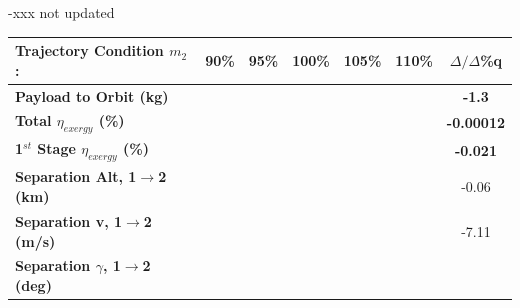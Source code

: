 -xxx not updated
\begin{table}[ht]
	\centering
	
	\begin{tabular}{l c c c c c c} %
	\hline \textbf{Trajectory Condition  \qquad  $m_{2}$: }
	&90\%
	&95\%
	&100\%
	& 105\%
	& 110\%
	& $\Delta/\Delta$\%q
		\\
		\hline \textbf{Payload to Orbit (kg)}
		& \textbf{\PayloadToOrbitmSPARTANNinetyNoReturn}
		& \textbf{\PayloadToOrbitmSPARTANNinetyFiveNoReturn}
		& \textbf{\PayloadToOrbitmSPARTANStandardNoReturn}
		& \textbf{\PayloadToOrbitmSPARTANOneHundredFiveNoReturn}
		& \textbf{\PayloadToOrbitmSPARTANOneHundredTenNoReturn}
		&\textbf{-1.3}
		\\
		\textbf{Total $\eta_{exergy}$ (\%)}
		& \textbf{\totalExergyEffmSPARTANNinetyNoReturn}
		& \textbf{\totalExergyEffmSPARTANNinetyFiveNoReturn}
		& \textbf{\totalExergyEffmSPARTANStandardNoReturn}
		& \textbf{\totalExergyEffmSPARTANOneHundredFiveNoReturn}
		& \textbf{\totalExergyEffmSPARTANOneHundredTenNoReturn}
		& \textbf{-0.00012}
		\\
		\hline 
		\textbf{1$^{st}$ Stage $\eta_{exergy}$ (\%)}
		& \textbf{\firstExergyEffmSPARTANNinetyNoReturn}
		& \textbf{\firstExergyEffmSPARTANNinetyFiveNoReturn}
		& \textbf{\firstExergyEffmSPARTANStandardNoReturn}
		& \textbf{\firstExergyEffmSPARTANOneHundredFiveNoReturn}
		& \textbf{\firstExergyEffmSPARTANOneHundredTenNoReturn}
		& \textbf{-0.021}
		\\
		\textbf{Separation Alt, 1$\rightarrow$2 (km)}
		& \firstsecondSeparationAltmSPARTANNinetyNoReturn
		& \firstsecondSeparationAltmSPARTANNinetyFiveNoReturn
		& \firstsecondSeparationAltmSPARTANStandardNoReturn
		& \firstsecondSeparationAltmSPARTANOneHundredFiveNoReturn
		& \firstsecondSeparationAltmSPARTANOneHundredTenNoReturn
		&-0.06
		\\
		\textbf{Separation v, 1$\rightarrow$2 (m/s)}
		& \firstsecondSeparationvmSPARTANNinetyNoReturn
		& \firstsecondSeparationvmSPARTANNinetyFiveNoReturn
		& \firstsecondSeparationvmSPARTANStandardNoReturn
		& \firstsecondSeparationvmSPARTANOneHundredFiveNoReturn
		& \firstsecondSeparationvmSPARTANOneHundredTenNoReturn
		&-7.11
		\\
		\textbf{Separation $\gamma$, 1$\rightarrow$2 (deg)}
		& \firstsecondSeparationgammamSPARTANNinetyNoReturn
		& \firstsecondSeparationgammamSPARTANNinetyFiveNoReturn
		& \firstsecondSeparationgammamSPARTANStandardNoReturn
		& \firstsecondSeparationgammamSPARTANOneHundredFiveNoReturn
		& \firstsecondSeparationgammamSPARTANOneHundredTenNoReturn

\end{tabular}
\end{table}
